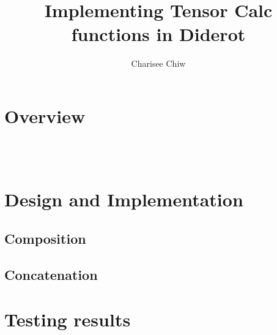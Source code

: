 \documentclass{article}
\title{Implementing Tensor Calc functions in Diderot}
\author{Charisee Chiw}
\begin{document}
\maketitle 

\section{Overview}


\noindent\\
\\

%
%

\section{Design and Implementation}
\subsection{Composition}

\subsection{Concatenation}

%
%

\section{Testing results}


%

 
\end{document}
